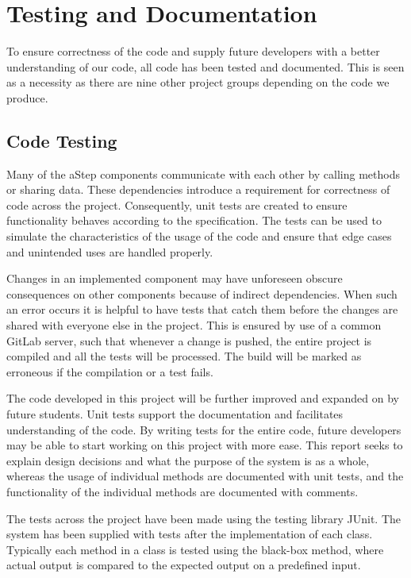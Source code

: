 \section{Testing and Documentation}\label{sec:unit_test}
To ensure correctness of the code and supply future developers with a better understanding of our code, all code has been tested and documented. This is seen as a necessity as there are nine other project groups depending on the code we produce.

\subsection{Code Testing}
Many of the aStep components communicate with each other by calling methods or sharing data. These dependencies introduce a requirement for correctness of code across the project. Consequently, unit tests are created to ensure functionality behaves according to the specification. The tests can be used to simulate the characteristics of the usage of the code and ensure that edge cases and unintended uses are handled properly. 

Changes in an implemented component may have unforeseen obscure consequences on other components because of indirect dependencies. When such an error occurs it is helpful to have tests that catch them before the changes are shared with everyone else in the project. This is ensured by use of a common GitLab server, such that whenever a change is pushed, the entire project is compiled and all the tests will be processed. The build will be marked as erroneous if the compilation or a test fails.

The code developed in this project will be further improved and expanded on by future students. Unit tests support the documentation and facilitates understanding of the code.
By writing tests for the entire code, future developers may be able to start working on this project with more ease. 
This report seeks to explain design decisions and what the purpose of the system is as a whole, whereas the usage of individual methods are documented with unit tests, and the functionality of the individual methods are documented with comments.

The tests across the project have been made using the testing library JUnit\cite{junit4}. The system has been supplied with tests after the implementation of each class. Typically each method in a class is tested using the black-box method, where actual output is compared to the expected output on a predefined input.

